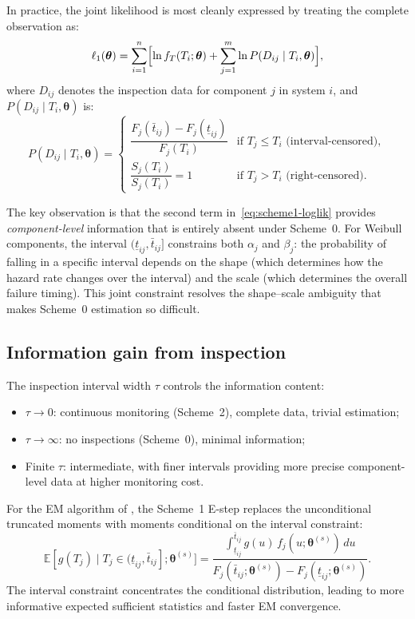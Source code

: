 \documentclass[12pt]{article}
\theoremstyle{definition}
\theoremstyle{remark}
\newcommand{\E}{\mathbb{E}}
\newcommand{\btheta}{\bm{\theta}}
\begin{document}
In practice, the joint likelihood is most cleanly expressed by
treating the complete observation as:
\begin{equation}\label{eq:scheme1-loglik}
  \ell_1(\btheta) = \sum_{i=1}^n \Bigl[
    \ln f_T(T_i; \btheta)
    + \sum_{j=1}^m \ln P(D_{ij} \mid T_i, \btheta)
  \Bigr],
\end{equation}
where $D_{ij}$ denotes the inspection data for component $j$ in
system $i$, and $P(D_{ij} \mid T_i, \btheta)$ is:
\begin{equation}\label{eq:scheme1-component}
  P(D_{ij} \mid T_i, \btheta) = \begin{cases}
    \dfrac{F_j(\bar{t}_{ij}) - F_j(\underline{t}_{ij})}
          {F_j(T_i)}
    & \text{if } T_j \leq T_i \text{ (interval-censored)}, \\[12pt]
    \dfrac{S_j(T_i)}{S_j(T_i)} = 1
    & \text{if } T_j > T_i \text{ (right-censored)}.
  \end{cases}
\end{equation}

The key observation is that the second term
in~\eqref{eq:scheme1-loglik} provides \emph{component-level}
information that is entirely absent under Scheme~0.  For Weibull
components, the interval $(\underline{t}_{ij}, \bar{t}_{ij}]$
constrains both $\alpha_j$ and $\beta_j$: the probability of
falling in a specific interval depends on the shape (which
determines how the hazard rate changes over the interval) and
the scale (which determines the overall failure timing).  This
joint constraint resolves the shape--scale ambiguity that makes
Scheme~0 estimation so difficult.

\subsection{Information gain from inspection}

The inspection interval width $\tau$ controls the information
content:
\begin{itemize}
\item $\tau \to 0$: continuous monitoring (Scheme~2), complete data,
  trivial estimation;
\item $\tau \to \infty$: no inspections (Scheme~0), minimal
  information;
\item Finite $\tau$: intermediate, with finer intervals
  providing more precise component-level data at higher
  monitoring cost.
\end{itemize}

For the EM algorithm of , the Scheme~1
E-step replaces the unconditional truncated moments with moments
conditional on the interval constraint:
\begin{equation}\label{eq:scheme1-em-estep}
  \E[g(T_j) \mid T_j \in (\underline{t}_{ij}, \bar{t}_{ij}];
  \btheta^{(s)}]
  = \frac{\int_{\underline{t}_{ij}}^{\bar{t}_{ij}}
    g(u)\, f_j(u; \btheta^{(s)})\, du}
    {F_j(\bar{t}_{ij}; \btheta^{(s)}) -
     F_j(\underline{t}_{ij}; \btheta^{(s)})}.
\end{equation}
The interval constraint concentrates the conditional distribution,
leading to more informative expected sufficient statistics and
faster EM convergence.
\end{document}
